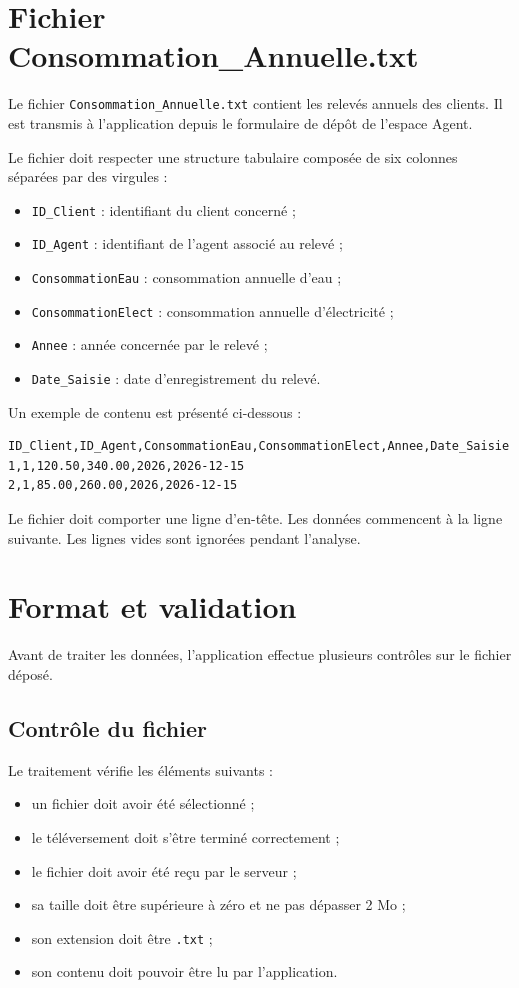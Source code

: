 \section{Fichier Consommation\_Annuelle.txt}

Le fichier \texttt{Consommation\_Annuelle.txt} contient les relevés annuels des clients. Il est transmis à l'application depuis le formulaire de dépôt de l'espace Agent.

Le fichier doit respecter une structure tabulaire composée de six colonnes séparées par des virgules :

\begin{itemize}
    \item \texttt{ID\_Client} : identifiant du client concerné ;
    \item \texttt{ID\_Agent} : identifiant de l'agent associé au relevé ;
    \item \texttt{ConsommationEau} : consommation annuelle d'eau ;
    \item \texttt{ConsommationElect} : consommation annuelle d'électricité ;
    \item \texttt{Annee} : année concernée par le relevé ;
    \item \texttt{Date\_Saisie} : date d'enregistrement du relevé.
\end{itemize}

Un exemple de contenu est présenté ci-dessous :

\begin{lstlisting}
ID_Client,ID_Agent,ConsommationEau,ConsommationElect,Annee,Date_Saisie
1,1,120.50,340.00,2026,2026-12-15
2,1,85.00,260.00,2026,2026-12-15
\end{lstlisting}

Le fichier doit comporter une ligne d'en-tête. Les données commencent à la ligne suivante. Les lignes vides sont ignorées pendant l'analyse.

\section{Format et validation}

Avant de traiter les données, l'application effectue plusieurs contrôles sur le fichier déposé.

\subsection{Contrôle du fichier}

Le traitement vérifie les éléments suivants :
\begin{itemize}
    \item un fichier doit avoir été sélectionné ;
    \item le téléversement doit s'être terminé correctement ;
    \item le fichier doit avoir été reçu par le serveur ;
    \item sa taille doit être supérieure à zéro et ne pas dépasser 2 Mo ;
    \item son extension doit être \texttt{.txt} ;
    \item son contenu doit pouvoir être lu par l'application.
\end{itemize}


